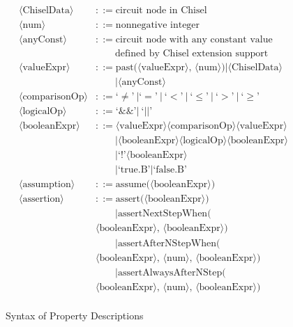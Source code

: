 \documentclass[conference]{IEEEtran}
\theoremstyle{definition}
\begin{document}
\begin{figure}[!htbp]
\begin{center}
\begin{equation*}
\begin{aligned}
    \langle \text{ChiselData} \rangle &::= \text{circuit node in Chisel} \\
    \langle \text{num} \rangle &::= \text{nonnegative integer} \\
    \langle \text{anyConst} \rangle &::= \text{circuit node with any constant value} \\ & \qquad \text{defined by Chisel extension support } \\
    \langle \text{valueExpr} \rangle &::= \text{past(} \langle \text{valueExpr} \rangle \text{, } \langle \text{num} \rangle \text{)} | \langle \text{ChiselData} \rangle \\ 
    & \qquad | \langle \text{anyConst} \rangle \\
    \langle \text{comparisonOp} \rangle &::= \text{`} \neq \text{'} \ | \text{`} = \text{'} \ | \ \text{`} < \text{'} \ |\ \text{`} \le \text{'} \ | \ \text{`} > \text{'} \ | \ \text{`} \ge \text{'}  \\
    \langle \text{logicalOp} \rangle &::= \text{`} \&\&\text{'} | \ \text{`} || \text{'} \\
    \langle \text{booleanExpr} \rangle &::=   \langle \text{valueExpr} \rangle \langle \text{comparisonOp} \rangle \langle \text{valueExpr} \rangle\\
    & \qquad |\langle \text{booleanExpr} \rangle \langle \text{logicalOp} \rangle \langle \text{booleanExpr} \rangle \\
    & \qquad | \text{`!'} \langle \text{booleanExpr} \rangle \\  
    & \qquad |  \text{`true.B'} | \text{`false.B'} \\
    \langle \text{assumption} \rangle &::= \text{assume(} \langle \text{booleanExpr} \rangle ) \\
    \langle \text{assertion} \rangle     &::= \text{assert(} \langle \text{booleanExpr} \rangle \text{)} \\
    & \qquad | \text{assertNextStepWhen(} \\ 
    & \langle \text{booleanExpr} \rangle \text{, } \langle \text{booleanExpr} \rangle \text{)} \\ 
    & \qquad | \text{assertAfterNStepWhen(} \\
    & \langle \text{booleanExpr} \rangle \text{, } \langle \text{num} \rangle \text{, } \langle \text {booleanExpr} \rangle \text{)} \\
    & \qquad | \text{assertAlwaysAfterNStep(} \\
    & \langle \text{booleanExpr} \rangle \text{, } \langle \text{num} \rangle \text{, } \langle \text {booleanExpr} \rangle \text{)} \\
\end{aligned}
\end{equation*}
\end{center}
\caption{Syntax of Property Descriptions}
\label{fig: syntax}
\end{figure}
\end{document}
